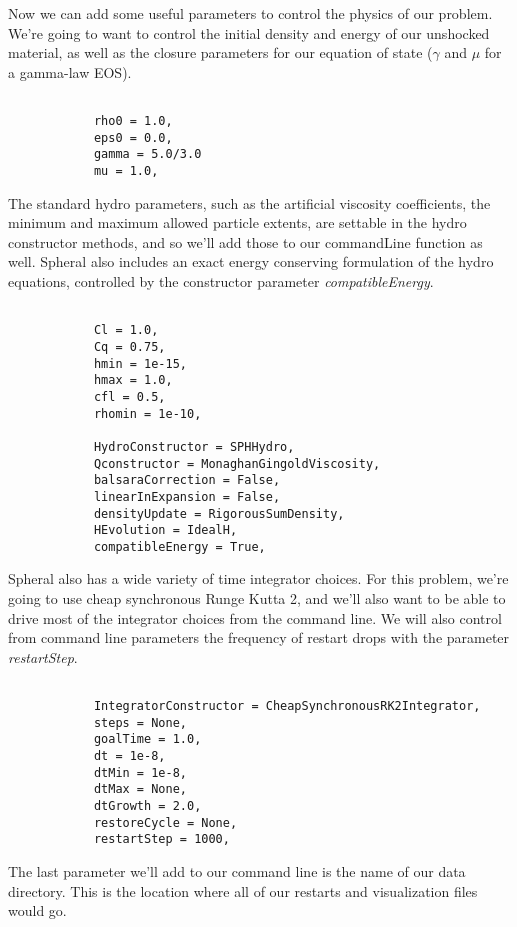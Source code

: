 \documentclass[11pt]{memoir}
\begin{document}
Now we can add some useful parameters to control the physics of our problem. We're going to want to control the initial density and energy of our unshocked material, as well as the closure parameters for our equation of state ($\gamma$ and $\mu$ for a gamma-law EOS).

\begin{lstlisting}[firstnumber=last]

			rho0 = 1.0,
			eps0 = 0.0,
			gamma = 5.0/3.0
			mu = 1.0,
\end{lstlisting}

The standard hydro parameters, such as the artificial viscosity coefficients, the minimum and maximum allowed particle extents, are settable in the hydro constructor methods, and so we'll add those to our commandLine function as well. Spheral also includes an exact energy conserving formulation of the hydro equations, controlled by the constructor parameter \textit{compatibleEnergy}.

\begin{lstlisting}[firstnumber=last]

			Cl = 1.0,
			Cq = 0.75,
			hmin = 1e-15,
			hmax = 1.0,
			cfl = 0.5,
			rhomin = 1e-10,
			
			HydroConstructor = SPHHydro,
			Qconstructor = MonaghanGingoldViscosity,
			balsaraCorrection = False,
			linearInExpansion = False,
			densityUpdate = RigorousSumDensity,
			HEvolution = IdealH,
			compatibleEnergy = True,
\end{lstlisting}

Spheral also has a wide variety of time integrator choices. For this problem, we're going to use cheap synchronous Runge Kutta 2, and we'll also want to be able to drive most of the integrator choices from the command line. We will also control from command line parameters the frequency of restart drops with the parameter \textit{restartStep}.

\begin{lstlisting}[firstnumber=last]

			IntegratorConstructor = CheapSynchronousRK2Integrator,
			steps = None,
			goalTime = 1.0,
			dt = 1e-8,
			dtMin = 1e-8,
			dtMax = None,
			dtGrowth = 2.0,
			restoreCycle = None,
			restartStep = 1000,
\end{lstlisting}

The last parameter we'll add to our command line is the name of our data directory. This is the location where all of our restarts and visualization files would go.
\end{document}
